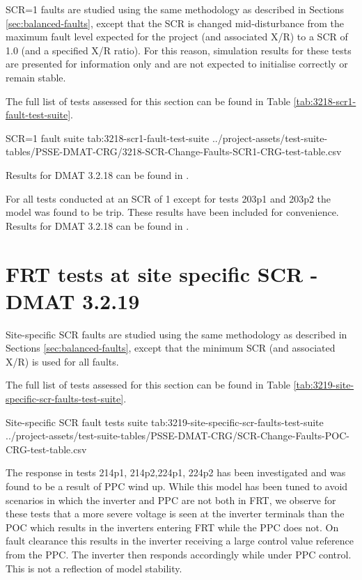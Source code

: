 \documentclass{../grid-link-report}
\newcommand{\projectassetsdir}{../project-assets}
\begin{document}
	SCR=1 faults are studied using the same methodology as described in Sections \ref{sec:balanced-faults}, except that the SCR is changed mid-disturbance from the maximum fault level expected for the project (and associated X/R) to a SCR of 1.0 (and a specified X/R ratio). For this reason, simulation results for these tests are presented for information only and are not expected to initialise correctly or remain stable.
	
	The full list of tests assessed for this section can be found in Table \ref{tab:3218-scr1-fault-test-suite}.
	
	{
		\fontsize{5}{7}\selectfont
		\autoscaledlongtable
		{SCR=1 fault suite}
		{tab:3218-scr1-fault-test-suite}
		{\projectassetsdir/test-suite-tables/PSSE-DMAT-CRG/3218-SCR-Change-Faults-SCR1-CRG-test-table.csv}
	}
	
	Results for DMAT 3.2.18 can be found in .
	
	For all tests conducted at an SCR of 1 except for tests 203p1 and 203p2 the model was found to be trip. These results have been included for convenience. Results for DMAT 3.2.18 can be found in .
	
	
	\section{FRT tests at site specific SCR - DMAT 3.2.19}		
	
	
	Site-specific SCR faults are studied using the same methodology as described in Sections \ref{sec:balanced-faults}, except that the minimum SCR (and associated X/R) is used for all faults.
	
	The full list of tests assessed for this section can be found in Table \ref{tab:3219-site-specific-scr-faults-test-suite}.
	
	{
		\fontsize{4}{6}\selectfont
		\autoscaledlongtable
		{Site-specific SCR fault tests suite}
		{tab:3219-site-specific-scr-faults-test-suite}
		{\projectassetsdir/test-suite-tables/PSSE-DMAT-CRG/SCR-Change-Faults-POC-CRG-test-table.csv}
	}
	
	The response in tests 214p1, 214p2,224p1, 224p2 has been investigated and was found to be a result of PPC wind up. While this model has been tuned to avoid scenarios in which the inverter and PPC are not both in FRT, we observe for these tests that a more severe voltage is seen at the inverter terminals than the POC which results in the inverters entering FRT while the PPC does not. On fault clearance this results in the inverter receiving a large control value reference from the PPC. The inverter then responds accordingly while under PPC control. This is not a reflection of model stability.
	
\end{document}
